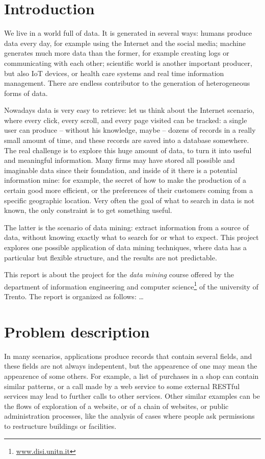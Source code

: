 \documentclass{acm_proc_article-sp-sigmod09}
\begin{document}


\section{Introduction}
We live in a world full of data. It is generated in several ways: humans produce data every day, for example using the Internet and the social media; machine generates much more data than the former, for example creating logs or communicating with each other; scientific world is another important producer, but also IoT devices, or health care systems and real time information management. There are endless contributor to the generation of heterogeneous forms of data.

Nowadays data is very easy to retrieve: let us think about the Internet scenario, where every click, every scroll, and every page visited can be tracked: a single user can produce -- without his knowledge, maybe -- dozens of records in a really small amount of time, and these records are saved into a database somewhere. The real challenge is to explore this huge amount of data, to turn it into useful and meaningful information. Many firms may have stored all possible and imaginable data since their foundation, and inside of it there is a potential information mine: for example, the secret of how to make the production of a certain good more efficient, or the preferences of their customers coming from a specific geographic location. Very often the goal of what to search in data is not known, the only constraint is to get something useful.

The latter is the scenario of data mining: extract information from a source of data, without knowing exactly what to search for or what to expect. This project explores one possible application of data mining techniques, where data has a particular but flexible structure, and the results are not predictable.

This report is about the project for the \emph{data mining} course offered by the department of information engineering and computer science\footnote{\url{www.disi.unitn.it}} of the university of Trento. The report is organized as follows: \dots

\section{Problem description}
In many scenarios, applications produce records that contain several fields, and these fields are not always indepentent, but the appearence of one may mean the appearence of some others. For example, a list of purchases in a shop can contain similar patterns, or a call made by a web service to some external RESTful services may lead to further calls to other services. Other similar examples can be the flows of exploration of a website, or of a chain of websites, or public administration processes, like the analysis of cases where people ask permissions to restructure buildings or facilities. 
\end{document}
